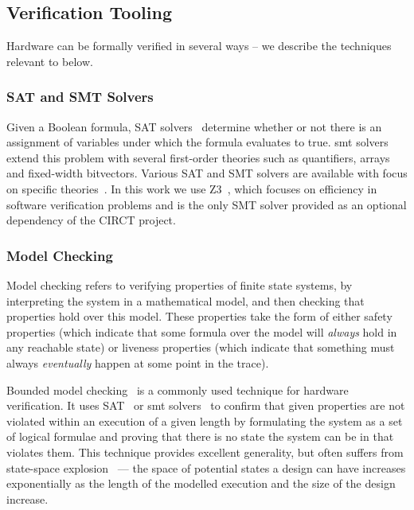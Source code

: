\documentclass[acmsmall,screen,review]{acmart}
\begin{document}
\subsection{Verification Tooling}
Hardware can be formally verified in several ways -- we describe the techniques relevant to \toolname{} below.


\subsubsection{SAT and SMT Solvers}
Given a Boolean formula, SAT solvers~\cite{sat_review} determine whether or not there is an assignment of variables under which the formula evaluates to true.
\ac{smt} solvers~\cite{barrett2021satisfiability} extend this problem with several first-order theories
such as quantifiers, arrays and fixed-width bitvectors.
Various SAT and SMT solvers are available with focus on specific theories~\cite{kowalewski2009boolector, niemetz2020bitwuzla}. 
In this work we use Z3~\cite{z3}, which focuses on efficiency in software verification problems and is the only SMT solver provided as an optional dependency of the CIRCT project.

\subsubsection{Model Checking}
Model checking refers to verifying properties of finite state systems, by interpreting the system in a mathematical model, and then checking that properties hold over this model.
These properties take the form of either safety properties (which indicate that some
formula over the model will \textit{always} hold in any reachable state) or liveness
properties (which indicate that something must always \textit{eventually}
happen at some point in the trace).

Bounded model checking~\cite{bmc_found_1} is a commonly used technique for hardware verification.
It uses SAT~\cite{model_checking_foundation0} or \ac{smt} solvers~\cite{smt_instead_of_sat} to confirm that given properties are not violated
within an execution of a given length by formulating the system as a set of
logical formulae and proving that there is no state the system can be in that
violates them. This technique provides excellent generality, but often suffers
from state-space explosion~\cite{Clarke2001, clarke2012explosion} --- the space of potential states a design can have increases exponentially as the length of the modelled execution and the size of the design increase.
\end{document}
